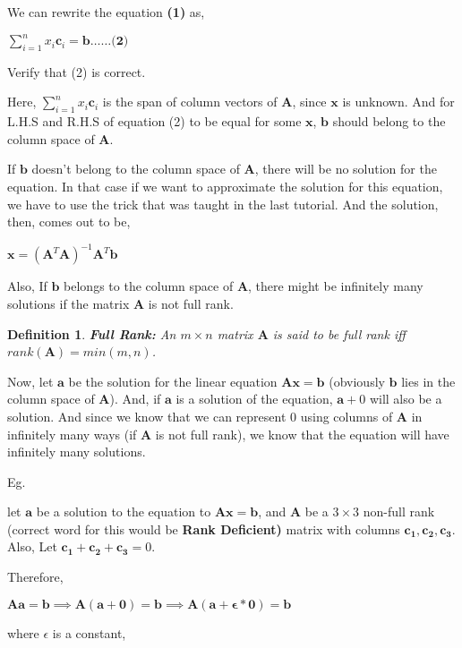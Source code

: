 \documentclass[a4paper]{article}
\newtheorem{definition}[theorem]{Definition}
\begin{document}
We can rewrite the equation \textbf{(1)} as,

\begin{center}
    $
    \displaystyle\sum_{i=1}^{n}x_i\textbf{c}_i = \textbf{b} \dots\dots \textbf{(2)}
    $
\end{center}
Verify that (2) is correct.

Here, $\displaystyle\sum_{i=1}^{n}x_i\textbf{c}_i$ is the span of column vectors of $\textbf{A}$, since $\textbf{x}$ is unknown. And for L.H.S and R.H.S of equation (2) to be equal for some $\textbf{x}$, $\textbf{b}$ should belong to the column space of $\textbf{A}$.

If $\textbf{b}$ doesn't belong to the column space of $\textbf{A}$, there will be no solution for the equation. In that case if we want to approximate the solution for this equation, we have to use the trick that was taught in the last tutorial. And the solution, then, comes out to be,
\begin{center}
    $
    \textbf{x} = (\textbf{A}^T\textbf{A})^{-1}\textbf{A}^T\textbf{b}
    $
\end{center}

Also, If $\mathbf{b}$ belongs to the column space of $\textbf{A}$, there might be infinitely many solutions if the matrix $\textbf{A}$ is not full rank.

\begin{definition}
    \textbf{Full Rank: } An $m\times n$ matrix $\mathbf{A}$ is said to be full rank iff $rank(\mathbf{A}) = min(m,n)$.
\end{definition}

Now, let $\mathbf{a}$ be the solution for the linear equation $\mathbf{Ax} = \mathbf{b}$ (obviously $\mathbf{b}$ lies in the column space of $\mathbf{A}$). And, if $\mathbf{a}$ is a solution of the equation, $\mathbf{a} + 0$ will also be a solution. And since we know that we can represent $0$ using columns of $\mathbf{A}$ in infinitely many ways (if $\mathbf{A}$ is not full rank), we know that the equation will have infinitely many solutions.

Eg.

let $\mathbf{a}$ be a solution to the equation to $\mathbf{Ax} = \mathbf{b}$, and $\mathbf{A}$ be a $3 \times 3$ non-full rank (correct word for this would be \textbf{Rank Deficient)} matrix with columns $\mathbf{c_1}, \mathbf{c_2}, \mathbf{c_3}$. Also, Let $\mathbf{c_1} + \mathbf{c_2} + \mathbf{c_3} = 0$.

Therefore,

\begin{center}
$
    \textbf{Aa} = \textbf{b} 
    
    \implies \mathbf{A(a+0)} = \mathbf{b}  
    
    \implies \mathbf{A(a+\epsilon*0)} = \mathbf{b} 
 $   
\end{center}
where $\epsilon$ is a constant,
\end{document}
